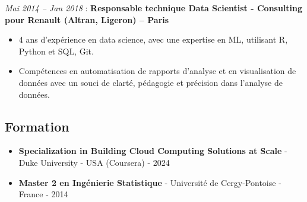 \documentclass[
  letterpaper,
  DIV=11,
  numbers=noendperiod]{scrartcl}
\providecommand{\tightlist}{%
  \setlength{\itemsep}{0pt}\setlength{\parskip}{0pt}}\usepackage{longtable,booktabs,array}
\begin{document}
\emph{Mai 2014 -- Jan 2018} : \textbf{Responsable technique Data
Scientist - Consulting pour Renault (Altran, Ligeron) -- Paris}

\begin{itemize}
\tightlist
\item
  4 ans d'expérience en data science, avec une expertise en ML,
  utilisant R, Python et SQL, Git.
\item
  Compétences en automatisation de rapports d'analyse et en
  visualisation de données avec un souci de clarté, pédagogie et
  précision dans l'analyse de données.
\end{itemize}

\subsection{Formation}\label{formation}

\begin{itemize}
\tightlist
\item
  \textbf{Specialization in Building Cloud Computing Solutions at Scale}
  - Duke University - USA (Coursera) - 2024
\item
  \textbf{Master 2 en Ingénierie Statistique} - Université de
  Cergy-Pontoise - France - 2014
\end{itemize}
\end{document}

